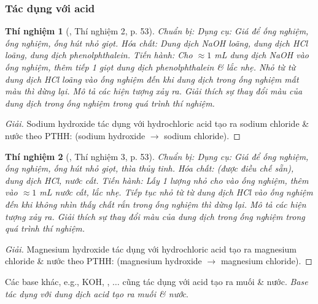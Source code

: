 \documentclass{article}
\newtheorem{thinghiem}{Thí nghiệm}
\begin{document}
\subsubsection{Tác dụng với acid}

\begin{thinghiem}[\cite{SGK_KHTN_8_Canh_Dieu}, Thí nghiệm 2, p. 53]
	\emph{Chuẩn bị:} Dụng cụ: Giá để ống nghiệm, ống nghiệm, ống hút nhỏ giọt. Hóa chất: Dung dịch \emph{NaOH} loãng, dung dịch \emph{HCl} loãng, dung dịch phenolphthalein. \emph{Tiến hành:} Cho $\approx1$ \emph{mL} dung dịch \emph{NaOH} vào ống nghiệm, thêm tiếp 1 giọt dung dịch phenolphthalein \& lắc nhẹ. Nhỏ từ từ dung dịch \emph{HCl} loãng vào ống nghiệm đến khi dung dịch trong ống nghiệm mất màu thì dừng lại. Mô tả các hiện tượng xảy ra. Giải thích sự thay đổi màu của dung dịch trong ống nghiệm trong quá trình thí nghiệm.
\end{thinghiem}

\begin{proof}[Giải]
	Sodium hydroxide tác dụng với hydrochloric acid tạo ra sodium chloride \& nước theo PTHH:  (sodium hydroxide $\to$ sodium chloride).
\end{proof}

\begin{thinghiem}[\cite{SGK_KHTN_8_Canh_Dieu}, Thí nghiệm 3, p. 53]
	\emph{Chuẩn bị:} Dụng cụ: Giá để ống nghiệm, ống nghiệm, ống hút nhỏ giọt, thìa thủy tinh. Hóa chất: \emph{} (được điều chế sẵn), dung dịch \emph{HCl}, nước cất. \emph{Tiến hành:} Lấy 1 lượng nhỏ \emph{} cho vào ống nghiệm, thêm vào $\approx1$ \emph{mL} nước cất, lắc nhẹ. Tiếp tục nhỏ từ từ dung dịch \emph{HCl} vào ống nghiệm đến khi không nhìn thấy chất rắn trong ống nghiệm thì dừng lại. Mô tả các hiện tượng xảy ra. Giải thích sự thay đổi màu của dung dịch trong ống nghiệm trong quá trình thí nghiệm.
\end{thinghiem}

\begin{proof}[Giải]
	Magnesium hydroxide tác dụng với hydrochloric acid tạo ra magnesium chloride \& nước theo PTHH:  (magnesium hydroxide $\to$ magnesium chloride).
\end{proof}
Các base khác, e.g., KOH, , $\ldots$ cũng tác dụng với acid tạo ra muối \& nước. \textit{Base tác dụng với dung dịch acid tạo ra muối \& nước}.
\end{document}
